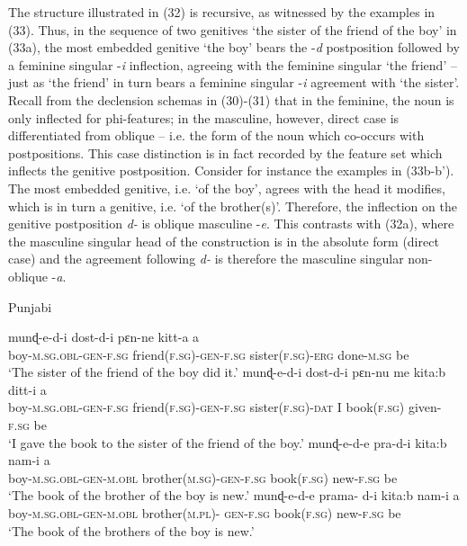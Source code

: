 \documentclass[output=paper]{langsci/langscibook}
\begin{document}
The structure illustrated in (32) is recursive, as witnessed by the examples in (33). Thus, in the sequence of two genitives ‘the sister of the friend of the boy’ in (33a), the most embedded genitive ‘the boy’ bears the -\textit{d} postposition followed by a feminine singular -\textit{i} inflection, agreeing with the feminine singular ‘the friend’ – just as ‘the friend’ in turn bears a feminine singular -\textit{i} agreement with ‘the sister’. Recall from the declension schemas in (30)-(31) that in the feminine, the noun is only inflected for phi-features; in the masculine, however, direct case is differentiated from oblique – i.e. the form of the noun which co-occurs with postpositions. This case distinction is in fact recorded by the feature set which inflects the genitive postposition. Consider for instance the examples in (33b-b’). The most embedded genitive, i.e. ‘of the boy’, agrees with the head it modifies, which is in turn a genitive, i.e. ‘of the brother(s)’. Therefore, the inflection on the genitive postposition \textit{d-} is oblique masculine -\textit{e}. This contrasts with (32a), where the masculine singular head of the construction is in the absolute form (direct case) and the agreement following \textit{d-} is therefore the masculine singular non-oblique -\textit{a}.

\ea%
    Punjabi\label{ex:manzini:33}\\
    \begin{xlista}
    \ex
    \gll     munɖ-e-d-i   dost-d-i   pɛn-ne    kitt-a         a  \\
             boy-\textsc{m.sg.obl-gen-f.sg}  friend\textsc{(f.sg)-gen-f.sg}  sister\textsc{(f.sg)-erg}    done-\textsc{m.sg}   be\\
    \glt     ‘The sister of the friend of the boy did it.’
    \gll    munɖ-e-d-i    dost-d-i   pɛn-nu  me  kita:b         ditt-i   a \\
             boy-\textsc{m.sg.obl-gen-f.sg}  friend\textsc{(f.sg)-gen-f.sg}  sister\textsc{(f.sg)-dat}   I          book\textsc{(f.sg)}   given\textsc{{}-f.sg}   be\\
    \glt     ‘I gave the book to the sister of the friend of the boy.’
    \ex      
    \gll    munɖ-e-d-e   pra-d-i   kita:b   nam-i    a \\
             boy-\textsc{m.sg.obl-gen-m.obl}  brother\textsc{(m.sg)-gen-f.sg}  book\textsc{(f.sg)}   new-\textsc{f.sg} be \\
    \glt     ‘The book of the brother of the boy is new.’
    \gll     munɖ-e-d-e   prama-  d-i   kita:b   nam-i       a\\
             boy-\textsc{m.sg.obl-gen-m.obl}  brother\textsc{(m.pl)-  gen-f.sg}   book\textsc{(f.sg)}   new-\textsc{f.sg} be \\
    \glt     ‘The book of the brothers of the boy is new.’
    \end{xlista}
    \z
    
\end{document}
